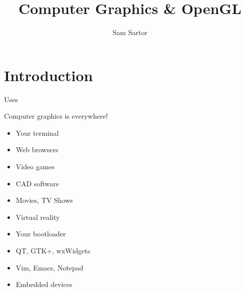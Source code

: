 \documentclass{lug}
\title{Computer Graphics \& OpenGL}
\author{Sam Sartor}
\institute{Mines Linux Users Group}
\newcommand{\splitslide}[4]{
    \noindent
    \begin{minipage}{#1 \textwidth - #2 }
        #3
    \end{minipage}%
    \hspace{ \dimexpr #2 * 2 \relax }%
    \begin{minipage}{\textwidth - #1 \textwidth - #2 }
        #4
    \end{minipage}
}
\begin{document}
\section{Introduction}

\begin{frame}{Uses}
    \splitslide{0.65}{.7em}{
        Computer graphics is everywhere!
        \begin{itemize}
            \item Your terminal
            \item Web browsers
            \item Video games
            \item CAD software
            \item Movies, TV Shows
            \item Virtual reality
            \item Your bootloader
            \item QT, GTK+, wxWidgets
            \item Vim, Emacs, Notepad
            \item Embedded devices
        \end{itemize}
    }{
}
\end{frame}
\end{document}
